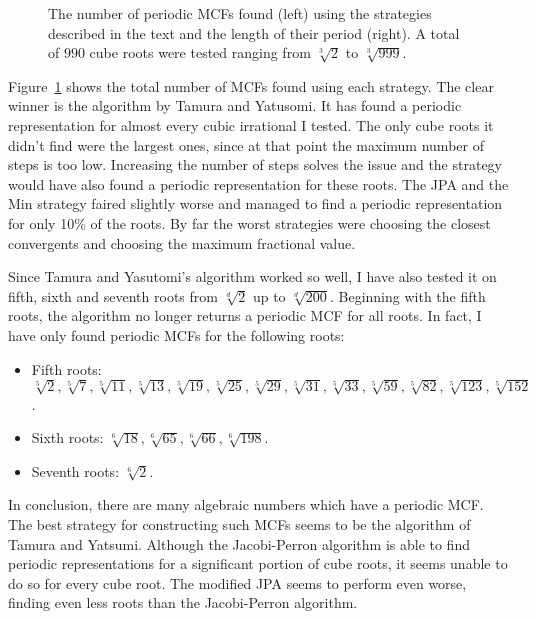\begin{figure}[tbp]
  \centering
  
  \caption{
    The number of periodic MCFs found (left) using the strategies described in the
    text and the length of their period (right).
    A total of $990$ cube roots were tested ranging from $\sqrt[3]{2}$ to $\sqrt[3]{999}$.
  }
  \label{fig:comparison}
\end{figure}

Figure~\ref{fig:comparison} shows the total number of MCFs found using each strategy.
The clear winner is the algorithm by Tamura and Yatusomi.
It has found a periodic representation for almost every cubic irrational I tested.
The only cube roots it didn't find were the largest ones,
since at that point the maximum number of steps is too low.
Increasing the number of steps solves the issue and the strategy would have
also found a periodic representation for these roots.
The JPA and the Min strategy faired slightly worse and managed to find a
periodic representation for only 10\% of the roots.
By far the worst strategies were choosing the closest convergents and choosing
the maximum fractional value.


Since Tamura and Yasutomi's algorithm worked so well,
I have also tested it on fifth, sixth and seventh roots
from $\sqrt[d]{2}$ up to $\sqrt[d]{200}$.
Beginning with the fifth roots, the algorithm no longer returns a periodic MCF for all roots.
In fact, I have only found periodic MCFs for the following roots:
\begin{itemize}
  \item Fifth roots:
    $\sqrt[5]{2}, \sqrt[5]{7}, \sqrt[5]{11}, \sqrt[5]{13}, \sqrt[5]{19},
    \sqrt[5]{25}, \sqrt[5]{29}, \sqrt[5]{31}, \sqrt[5]{33}, \sqrt[5]{59},
    \sqrt[5]{82}, \sqrt[5]{123}, \sqrt[5]{152}$.
  \item Sixth roots: $\sqrt[6]{18}, \sqrt[6]{65}, \sqrt[6]{66},\sqrt[6]{198}$.
  \item Seventh roots: $\sqrt[6]{2}$.
\end{itemize}

In conclusion,
there are many algebraic numbers which have a periodic MCF.
The best strategy for constructing such MCFs seems to be the algorithm of Tamura and Yatsumi.
Although the Jacobi-Perron algorithm is able to find periodic representations
for a significant portion of cube roots, it seems unable to do so for every
cube root.
The modified JPA seems to perform even worse, finding even less roots than the
Jacobi-Perron algorithm.


